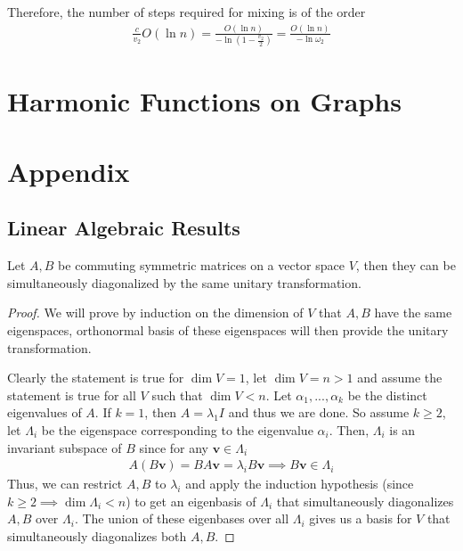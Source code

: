 \documentclass{math}
\renewcommand{\vec}[1]{\boldsymbol{#1}}
\begin{document}
Therefore, the number of steps required for mixing is of the order
\begin{align*}
    \frac{c}{v_2}O(\ln{n}) = \frac{O(\ln{n})}{-\ln\left(1 - \frac{v_2}{2}\right)} = \frac{O(\ln{n})}{-\ln{\omega_2}}
\end{align*}

\section{Harmonic Functions on Graphs}

\section{Appendix}

\subsection{Linear Algebraic Results}

\begin{theorem}
    Let $A, B$ be commuting symmetric matrices on a vector space $V$, then they can be simultaneously diagonalized by the same unitary transformation.
\end{theorem}
\begin{proof}
    We will prove by induction on the dimension of $V$ that $A, B$ have the same eigenspaces,
    orthonormal basis of these eigenspaces will then provide the unitary transformation.

    Clearly the statement is true for $\dim V = 1$, let $\dim V = n > 1$ and assume the statement is true for all $V$ such that $\dim V < n$.
    Let $\alpha_1, ..., \alpha_k$ be the distinct eigenvalues of $A$. If $k = 1$, then $A = \lambda_1 I$ and thus we are done.
    So assume $k \geq 2$, let $\Lambda_i$ be the eigenspace corresponding to the eigenvalue $\alpha_i$.
    Then, $\Lambda_i$ is an invariant subspace of $B$ since for any $\vec{v} \in \Lambda_i$
    \begin{align*}
        A(B\vec{v}) = BA\vec{v} = \lambda_i B \vec{v} \implies B\vec{v} \in \Lambda_i
    \end{align*}
    Thus, we can restrict $A, B$ to $\lambda_i$ and apply the induction hypothesis (since $k \geq 2 \implies \dim \Lambda_i < n$)
    to get an eigenbasis of $\Lambda_i$ that simultaneously diagonalizes $A, B$ over $\Lambda_i$. The union of these eigenbases over all $\Lambda_i$ gives us a basis for $V$
    that simultaneously diagonalizes both $A, B$.
\end{proof}
\end{document}
